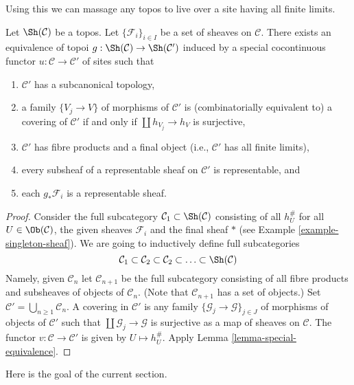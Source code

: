 \noindent
Using this we can massage any topos to live over a site having
all finite limits.

\begin{lemma}
\label{lemma-topos-good-site}
Let $\Sh(\mathcal{C})$ be a topos. Let $\{\mathcal{F}_i\}_{i \in I}$
be a set of sheaves on $\mathcal{C}$. There exists an equivalence of topoi
$g : \Sh(\mathcal{C}) \to \Sh(\mathcal{C}')$ induced by a special
cocontinuous functor $u : \mathcal{C} \to \mathcal{C}'$ of sites
such that
\begin{enumerate}
\item $\mathcal{C}'$ has a subcanonical topology,
\item a family $\{V_j \to V\}$ of morphisms of $\mathcal{C}'$
is (combinatorially equivalent to) a covering of $\mathcal{C}'$
if and only if $\coprod h_{V_j} \to h_V$ is surjective,
\item $\mathcal{C}'$ has fibre products and a final object
(i.e., $\mathcal{C}'$ has all finite limits),
\item every subsheaf of a representable sheaf on $\mathcal{C}'$
is representable, and
\item each $g_*\mathcal{F}_i$ is a representable sheaf.
\end{enumerate}
\end{lemma}

\begin{proof}
Consider the full subcategory
$\mathcal{C}_1 \subset \Sh(\mathcal{C})$ consisting of all
$h_U^\#$ for all $U \in \Ob(\mathcal{C})$, the given sheaves
$\mathcal{F}_i$ and the final sheaf $*$ (see
Example \ref{example-singleton-sheaf}). We are going to inductively
define full subcategories
$$
\mathcal{C}_1 \subset \mathcal{C}_2 \subset \mathcal{C}_2 \subset \ldots
\subset \Sh(\mathcal{C})
$$
Namely, given $\mathcal{C}_n$ let $\mathcal{C}_{n + 1}$ be the full
subcategory consisting of all fibre products and subsheaves of objects
of $\mathcal{C}_n$. (Note that $\mathcal{C}_{n + 1}$ has a set
of objects.) Set
$\mathcal{C}' = \bigcup_{n \geq 1} \mathcal{C}_n$.
A covering in $\mathcal{C}'$ is any family
$\{\mathcal{G}_j \to \mathcal{G}\}_{j \in J}$ of morphisms of objects
of $\mathcal{C}'$ such that
$\coprod \mathcal{G}_j \to \mathcal{G}$ is surjective
as a map of sheaves on $\mathcal{C}$.
The functor $v : \mathcal{C} \to \mathcal{C'}$ is given by
$U \mapsto h_U^\#$. Apply
Lemma \ref{lemma-special-equivalence}.
\end{proof}

\noindent
Here is the goal of the current section.

